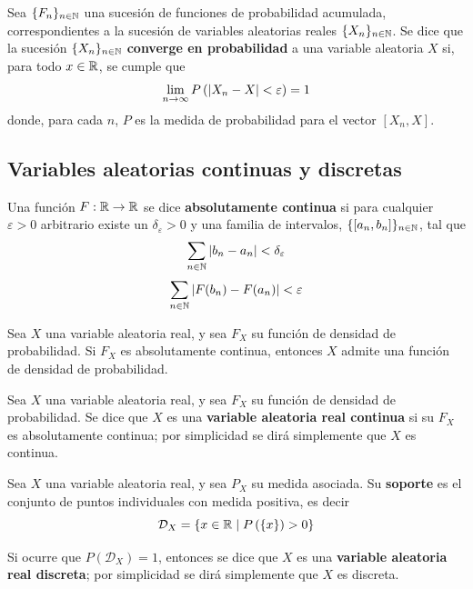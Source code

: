 \begin{definicion}
Sea $\{ F_n \}_{n\in \mathbb{N}}$ una sucesión de funciones de probabilidad acumulada, correspondientes a la sucesión de variables aleatorias reales $\{ X_n \}_{n\in \mathbb{N}}$. Se dice que la sucesión $\{ X_n \}_{n\in \mathbb{N}}$ \textbf{converge en probabilidad} a una variable aleatoria $X$ si, para todo $x\in \mathbb{R}$, se cumple que
\begin{equation}
\lim_{n\rightarrow\infty} P\left( \left| X_n-X \right| < \varepsilon \right) = 1
\end{equation}
donde, para cada $n$, $P$ es la medida de probabilidad para el vector $[X_n, X]$.
\end{definicion}


\subsection{Variables aleatorias continuas y discretas}

\begin{definicion}
Una función $F: \mathbb{R} \rightarrow \mathbb{R}$ se dice \textbf{absolutamente continua} si para cualquier $\varepsilon>0$ arbitrario existe un $\delta_\varepsilon>0$ y una familia de intervalos, $\{ [a_n, b_n]\}_{n\in \mathbb{N}}$, tal que
\begin{equation}
\sum_{n\in \mathbb{N}} \left| b_n - a_n \right| < \delta_\varepsilon
\end{equation}
\begin{equation}
\sum_{n\in \mathbb{N}} \left| F(b_n) - F(a_n) \right| < \varepsilon 
\end{equation}
\end{definicion}

\begin{proposicion}
Sea $X$ una variable aleatoria real, y sea $F_X$ su función de densidad de probabilidad.
%
Si $F_X$ es absolutamente continua, entonces $X$ admite una función de densidad de probabilidad.
\end{proposicion}

\begin{definicion}
Sea $X$ una variable aleatoria real, y sea $F_X$ su función de densidad de probabilidad.
%
Se dice que $X$ es una \textbf{variable aleatoria real continua} si su $F_X$ es absolutamente continua; por simplicidad se dirá simplemente que $X$ es continua.
\end{definicion}

\begin{definicion}
Sea $X$ una variable aleatoria real, y sea $P_X$ su medida asociada.
%
Su \textbf{soporte} es el conjunto de puntos individuales con medida positiva, es decir
\begin{equation}
\mathcal{D}_X = \left\{ x\in \mathbb{R} \mathrel{}\middle|\mathrel{} P\left( \left\{ x\right\} \right)>0 \right\}
\end{equation}

Si ocurre que $P(\mathcal{D}_X) = 1$, entonces se dice que $X$ es una \textbf{variable aleatoria real discreta}; por simplicidad se dirá simplemente que $X$ es discreta.
\end{definicion}

